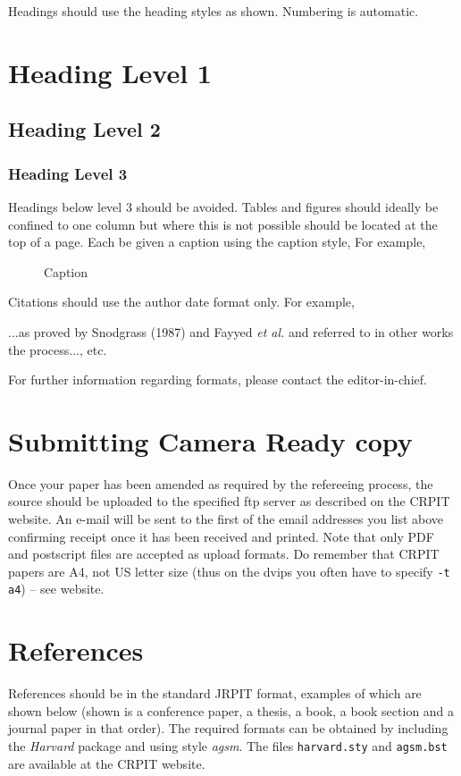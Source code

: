 \documentclass{CRPITStyle}
\begin{document}
Headings should use the heading styles as shown.  Numbering is automatic.

\section{Heading Level 1}
\subsection{Heading Level 2}
\subsubsection{Heading Level 3}
Headings below level 3 should be avoided.
Tables and figures should ideally be confined to one column but where this is not possible should be located at the top of a page.  Each be given a caption using the caption style, For example, 

\begin{figure}[htb]
\caption{\protect\label{xyz}  Caption}
\end{figure}

Citations should use the author date format only.  For example, 

...as proved by Snodgrass (1987) \nocite{Snodgrass87} and Fayyed {\it et al.} \cite{FPS96} and referred to in other works \cite{BenZvi82,Bentley86,AIS93} the process..., etc.

For further information regarding formats, please contact the editor-in-chief.

\section{Submitting Camera Ready copy}
Once your paper has been amended as required by the refereeing process, the source should be uploaded to the specified ftp server as described on the CRPIT website.  An e-mail will be sent to the first of the email addresses you list above confirming receipt once it has been received and printed.  
Note that only PDF and postscript files are accepted as upload formats.  Do remember that CRPIT papers are A4, not US letter size (thus on the dvips you often have to specify {\tt -t a4}) -- see website.

\section{References}
References should be in the standard JRPIT format, examples of which are shown below (shown is a conference paper, a thesis, a book, a book section and a journal paper in that order).  The required formats can be obtained by including the {\it Harvard} package and using style {\it agsm}.  The files {\tt harvard.sty} and {\tt agsm.bst} are available at the CRPIT website.
\end{document}
